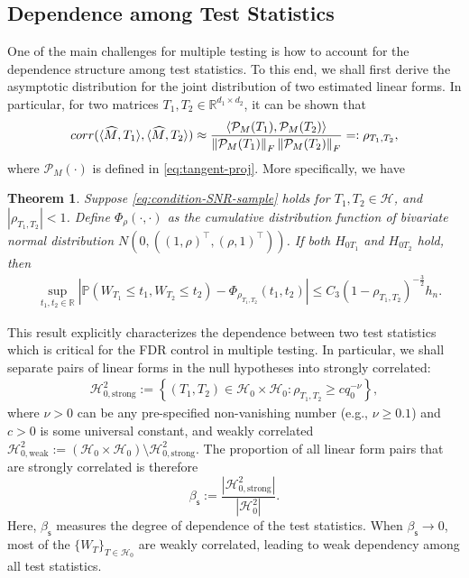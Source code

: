 \documentclass[12pt]{article}
\newcommand{\tF}{{\rm F}}
\newcommand{\abs}[1]{\left\lvert#1\right\rvert}
\newcommand{\norm}[1]{\left\lVert#1\right\rVert}
\newcommand{\R}{\mathbb{R}}
\newcommand{\cH}{\mathcal{H}}
\newcommand{\cP}{\mathcal{P}}
\def\calH{{\mathcal H}}
\newtheorem{Theorem}{Theorem}
\theoremstyle{plain}
\begin{document}
\begin{sloppypar}
\subsection{Dependence among Test Statistics}\label{sec:dependence}
One of the main challenges for multiple testing is how to account for the dependence structure among test statistics. To this end, we shall first derive the asymptotic distribution for the joint distribution of two estimated linear forms. In particular, for two matrices $T_1, T_2\in \R^{d_1\times d_2}$, it can be shown that
\begin{equation}\label{eq:corr}
\texttt{corr}(\langle \widehat{M}, T_1\rangle, \langle \widehat{M}, T_2\rangle)\approx \frac{\left\langle \cP_M(T_1) ,\cP_M(T_2)  \right\rangle }{ \norm{\cP_M(T_1)}_{\tF}\norm{\cP_M(T_2)}_{\tF} }=:	\rho_{T_1,T_2},
\end{equation}
where $\cP_M(\cdot)$ is defined in \eqref{eq:tangent-proj}. More specifically, we have


\begin{Theorem}\label{thm:asymp-two-var} 
	Suppose \eqref{eq:condition-SNR-sample} holds for  $T_1,T_2\in \cH$, and $|\rho_{T_1,T_2}|<1$. Define  $\Phi_\rho(\cdot,\cdot)$ as the cumulative distribution function of bivariate normal distribution $N(0,((1, \rho)^\top, (\rho, 1)^\top))$.  If both $H_{0T_1}$ and $H_{0T_2}$ hold, then
	\begin{equation*}
		\begin{aligned}
			&\sup _{t_1,t_2 \in \mathbb{R}}\left|\mathbb{P}\left(W_{T_1} \leq t_1, W_{T_2} \leq t_2\right)-\Phi_{
				\rho_{T_1,T_2}}\left(t_1,t_2\right)\right| \le C_3(1-\rho_{T_1,T_2})^{-\frac{3}{2}} h_n.
		\end{aligned}
	\end{equation*}
\end{Theorem}

This result explicitly characterizes the dependence between two test statistics which is critical for the FDR control in multiple testing. In particular, we shall separate pairs of linear forms in the null hypotheses into strongly correlated:
\begin{equation}\label{eq:weak-corr-1}
	\begin{aligned}
		\cH_{0,\text{strong} }^2 := \left\{ (T_1,T_2)\in\cH_0\times \cH_0 : \rho_{T_1,T_2}\ge c q_0^{-\nu} \right\},
	\end{aligned}
\end{equation}
where $\nu>0$ can be any pre-specified non-vanishing number (e.g., $\nu\ge 0.1$) and $c>0$ is some universal constant, and weakly correlated $\cH_{0,\text{weak} }^2:=(\calH_0\times \calH_0)\setminus \cH_{0,\text{strong} }^2$. The proportion of  all linear form pairs that are strongly correlated is therefore
\begin{equation}\label{eq:beta-s}
    \beta_{\mathsf{s} } := \frac{ \abs{ \cH_{0,\text{strong} }^2 }   }{\abs{ \cH_{0}^2 }}.
\end{equation}
Here, $\beta_{\mathsf{s} }$ measures the degree of dependence of the test statistics. When $\beta_{\mathsf{s} }\to0$, most of the $\{W_T\}_{T\in\cH_0}$ are  weakly correlated, leading to weak dependency among all test statistics.


\end{sloppypar}
\end{document}
